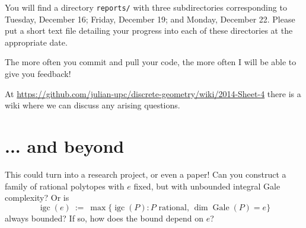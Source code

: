 \documentclass[11pt]{amsart}
\DeclareMathOperator{\igc}{igc}
\DeclareMathOperator{\Gale}{Gale}
\begin{document}
\medskip
You will find a directory \texttt{reports/} with three subdirectories corresponding to Tuesday, December 16; Friday, December 19; and Monday, December 22. Please put a short text file detailing your progress into each of these directories at the appropriate date.

\medskip
The more often you commit and pull your code, the more often I will be able to give you feedback!

\medskip
At \url{https://github.com/julian-upc/discrete-geometry/wiki/2014-Sheet-4} there is a wiki where we can discuss any arising questions. 

\section*{... and beyond}

This could turn into a research project, or even a paper! Can you construct a family of rational polytopes with $e$ fixed, but with unbounded integral Gale complexity? Or is 
\[ 
   \igc(e)
   \ := \
   \max\big\{\igc(P) : P \text{ rational, }\dim\Gale(P)=e\big\}
\]
always bounded? If so, how does the bound depend on $e$?
\end{document}
